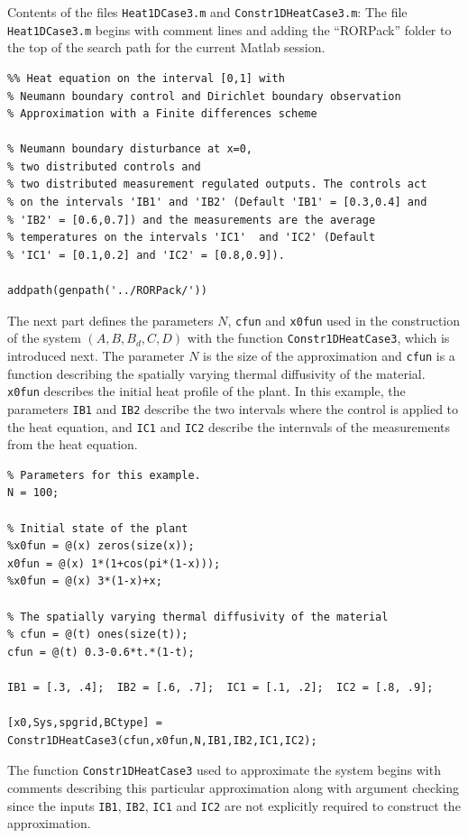 \documentclass[11pt, a4paper]{amsart}
\theoremstyle{definition}
\numberwithin{equation}{section}
\begin{document}
Contents of the files \texttt{Heat1DCase3.m} and \texttt{Constr1DHeatCase3.m}: The file \texttt{Heat1DCase3.m} begins with comment lines and adding the ``RORPack'' folder to the top of the search path for the current Matlab session.

\begin{lstlisting}
%% Heat equation on the interval [0,1] with 
% Neumann boundary control and Dirichlet boundary observation 
% Approximation with a Finite differences scheme 

% Neumann boundary disturbance at x=0,
% two distributed controls and
% two distributed measurement regulated outputs. The controls act 
% on the intervals 'IB1' and 'IB2' (Default 'IB1' = [0.3,0.4] and 
% 'IB2' = [0.6,0.7]) and the measurements are the average 
% temperatures on the intervals 'IC1'  and 'IC2' (Default 
% 'IC1' = [0.1,0.2] and 'IC2' = [0.8,0.9]).

addpath(genpath('../RORPack/'))
\end{lstlisting}

The next part defines the parameters $N$, \texttt{cfun} and \texttt{x0fun} used in the construction of the system $(A,B,B_d,C,D)$ with the function \texttt{Constr1DHeatCase3}, which is introduced next. The parameter $N$ is the size of the approximation and \texttt{cfun} is a function describing the spatially varying thermal diffusivity of the material. \texttt{x0fun} describes the initial heat profile of the plant.
In this example, the parameters \texttt{IB1} and \texttt{IB2} describe the two intervals where the control is applied to the heat equation, and \texttt{IC1} and \texttt{IC2} describe the internvals of the measurements from the heat equation.

\begin{lstlisting}
% Parameters for this example.
N = 100; 

% Initial state of the plant
%x0fun = @(x) zeros(size(x));
x0fun = @(x) 1*(1+cos(pi*(1-x)));
%x0fun = @(x) 3*(1-x)+x;

% The spatially varying thermal diffusivity of the material
% cfun = @(t) ones(size(t));
cfun = @(t) 0.3-0.6*t.*(1-t);

IB1 = [.3, .4];  IB2 = [.6, .7];  IC1 = [.1, .2];  IC2 = [.8, .9];

[x0,Sys,spgrid,BCtype] = Constr1DHeatCase3(cfun,x0fun,N,IB1,IB2,IC1,IC2);
 \end{lstlisting}

The function \texttt{Constr1DHeatCase3} used to approximate the system begins with comments describing this particular approximation along with argument checking since the inputs \texttt{IB1}, \texttt{IB2}, \texttt{IC1} and \texttt{IC2} are not explicitly required to construct the approximation.
\end{document}
